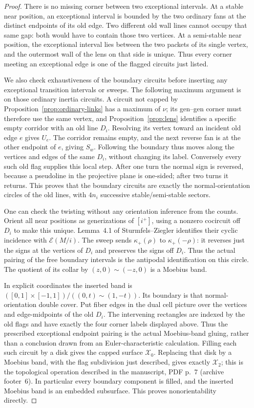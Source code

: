 \documentclass[11pt]{article}
\theoremstyle{definition}\newtheorem{definition}[theorem]{Definition}
\begin{document}
\begin{proof}
There is no missing corner between two exceptional intervals. At a
stable near position, an exceptional interval is bounded by the two
ordinary fans at the distinct endpoints of its old edge. Two different
old wall lines cannot occupy that same gap: both would have to contain
those two vertices. At a semi-stable near position, the exceptional
interval lies between the two packets of its single vertex, and the
outermost wall of the lens on that side is unique. Thus every corner
meeting an exceptional edge is one of the flagged circuits just listed.

We also check exhaustiveness of the boundary circuits before inserting
any exceptional transition intervals or sweeps. The following maximum
argument is on those ordinary inertia circuits. A circuit not capped by Proposition~\ref{prop:ordinary-links} has a maximum of
$\nu$; its gen--gen corner must therefore use the same vertex, and
Proposition~\ref{prop:lens} identifies a specific empty corridor with an old line $D_i$.
Resolving its vertex toward an incident old edge $e$ gives $U_e$.
The corridor remains empty, and the next reverse fan is at the other
endpoint of $e$, giving $S_w$. Following the boundary thus moves along
the vertices and edges of the same $D_i$, without changing its label.
Conversely every such old flag supplies this local step. After one
turn the normal sign is reversed, because a pseudoline in the
projective plane is one-sided; after two turns it returns. This proves
that the boundary circuits are exactly the normal-orientation circles
of the old lines, with $4n_i$ successive stable/semi-stable sectors.

One can check the twisting without any orientation inference from the
counts. Orient all near positions as generizations of $[i^+]$, using
a nonzero cocircuit off $D_i$ to make this unique. Lemma~4.1 of
Sturmfels--Ziegler identifies their cyclic incidence with
$\mathcal E(M/i)$. The sweep sends
$\kappa_+(\rho)$ to $\kappa_+(-\rho)$: it reverses just the signs at
the vertices of $D_i$ and preserves the signs off $D_i$.
Thus the actual pairing of the free boundary intervals is the
antipodal identification on this circle. The quotient of its collar
by $(z,0)\sim(-z,0)$ is a Moebius band.

In explicit coordinates the inserted band is
$([0,1]\times[-1,1])/((0,t)\sim(1,-t))$.
Its boundary is that normal-orientation double cover. Put fiber edges
in the dual cell picture over the vertices and edge-midpoints of the
old $D_i$. The intervening
rectangles are indexed by the old flags and have exactly the four
corner labels displayed above. Thus the prescribed exceptional
endpoint pairing is the actual Moebius-band gluing, rather than a
conclusion drawn from an Euler-characteristic calculation.
Filling each such circuit by a disk gives the capped surface
$\mathcal X_0$. Replacing that disk by a Moebius band, with the flag
subdivision just described, gives exactly $\mathcal X_2$; this is the
topological operation described in the manuscript, PDF p.~7
(archive footer~6). In particular every boundary
component is filled, and the inserted Moebius band is an embedded
subsurface. This proves nonorientability directly.


\end{proof}
\end{document}
